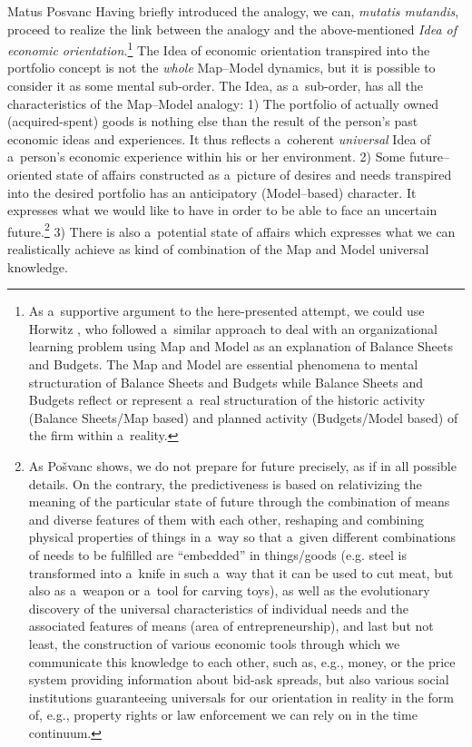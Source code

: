 \begin{artengenv}{Matus Posvanc}
Having briefly introduced the analogy, we can, \textit{mutatis mutandis}, proceed to realize the link between the analogy and the above-mentioned \textit{Idea of economic orientation.}\footnote{As a~supportive argument to the here-presented attempt, we could use Horwitz 
\parencite*[][]{Horwitz2010Sensory}, %
 who followed a~similar approach to deal with an organizational learning problem using Map and Model as an explanation of Balance Sheets and Budgets. The Map and Model are essential phenomena to mental structuration of Balance Sheets and Budgets while Balance Sheets and Budgets reflect or represent a~real structuration of the historic activity (Balance Sheets/Map based) and planned activity (Budgets/Model based) of the firm within a~reality.} The Idea of economic orientation transpired into the portfolio concept is not the \textit{whole} Map–Model dynamics, but it is possible to consider it as some mental sub-order. The Idea, as a~sub-order, has all the characteristics of the Map–Model analogy: 1) The portfolio of actually owned (acquired-spent) goods is nothing else than the result of the person's past economic ideas and experiences. It thus reflects a~coherent \textit{universal} Idea of a~person's economic experience within his or her environment. 2) Some future–oriented state of affairs constructed as a~picture of desires and needs transpired into the desired portfolio has an anticipatory (Model–based) character. It expresses what we would like to have in order to be able to face an uncertain future.\footnote{As Pošvanc 
\parencite*[][]{Posvanc2021Evolutionary} %
 shows, we do not prepare for future precisely, as if in all possible details. On the contrary, the predictiveness is based on relativizing the meaning of the particular state of future through the combination of means and diverse features of them with each other, reshaping and combining physical properties of things in a~way so that a~given different combinations of needs to be fulfilled are ``embedded'' in things/goods (e.g. steel is transformed into a~knife in such a~way that it can be used to cut meat, but also as a~weapon or a~tool for carving toys), as well as the evolutionary discovery of the universal characteristics of individual needs and the associated features of means (area of entrepreneurship), and last but not least, the construction of various economic tools through which we communicate this knowledge to each other, such as, e.g., money, or the price system providing information about bid-ask spreads, but also various social institutions guaranteeing universals for our orientation in reality in the form of, e.g., property rights or law enforcement we can rely on in the time continuum.} 3) There is also a~potential state of affairs which expresses what we can realistically achieve as kind of combination of the Map and Model universal knowledge.




\end{artengenv}
